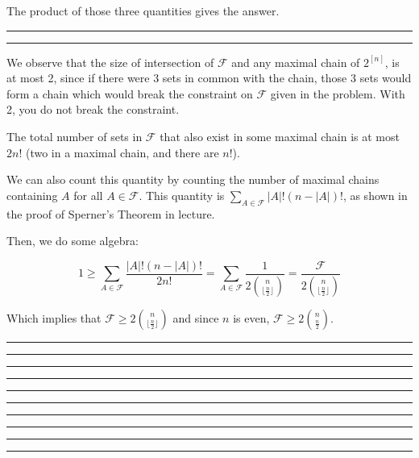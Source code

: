 \documentclass[11pt,letterpaper]{article}
\newcommand{\question}[1] {\vspace{.25in} \hrule\vspace{0.5em}
\noindent{\bf #1} \vspace{0.5em}
\hrule \vspace{.10in}}
\begin{document}
The product of those three quantities gives the answer.


\question{2}
We observe that the size of intersection of $\mathcal{F}$ and any maximal chain of $2^{[n]}$,
is at most 2, since if there were 3 sets in common with the chain,
those 3 sets would form a chain which would break the constraint on $\mathcal{F}$ given in the problem.
With 2, you do not break the constraint.

The total number of sets in $\mathcal{F}$ that also exist in some maximal chain is at most $2n!$ (two in a maximal chain, and there are $n!$).

We can also count this quantity by counting the number of maximal chains containing $A$ for all $A \in \mathcal{F}$. This quantity is $\sum_{A \in \mathcal{F}} |A|!(n-|A|)!$, as shown in the proof of Sperner's Theorem in lecture.

Then, we do some algebra:

$$ 1 \geq \sum_{A \in \mathcal{F}} \frac{|A|!(n-|A|)!}{2n!} = \sum_{A \in \mathcal{F}} \frac{1}{2{n \choose \lfloor \frac{n}{2} \rfloor }} = \frac{\mathcal{F}}{2{n \choose \lfloor \frac{n}{2} \rfloor }}$$

Which implies that $\mathcal{F} \geq 2{n \choose \lfloor \frac{n}{2} \rfloor }$ and since $n$ is even, $\mathcal{F} \geq 2{n \choose \frac{n}{2}}$.


\question{3}

\question{4}

\question{5}

\question{6}

\question{7}
\end{document}

